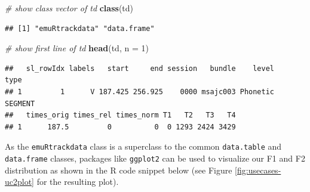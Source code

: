 \documentclass[]{book}
\newenvironment{Shaded}{\begin{snugshade}}{\end{snugshade}}
\newcommand{\CommentTok}[1]{\textcolor[rgb]{0.56,0.35,0.01}{\textit{#1}}}
\newcommand{\DataTypeTok}[1]{\textcolor[rgb]{0.13,0.29,0.53}{#1}}
\newcommand{\DecValTok}[1]{\textcolor[rgb]{0.00,0.00,0.81}{#1}}
\newcommand{\KeywordTok}[1]{\textcolor[rgb]{0.13,0.29,0.53}{\textbf{#1}}}
\newcommand{\NormalTok}[1]{#1}
\newcommand{\OperatorTok}[1]{\textcolor[rgb]{0.81,0.36,0.00}{\textbf{#1}}}
\newcommand{\OtherTok}[1]{\textcolor[rgb]{0.56,0.35,0.01}{#1}}
\newcommand{\StringTok}[1]{\textcolor[rgb]{0.31,0.60,0.02}{#1}}
\theoremstyle{definition}
\theoremstyle{definition}
\theoremstyle{definition}
\theoremstyle{remark}
\begin{document}
\begin{Shaded}
\begin{Highlighting}[]
\CommentTok{# show class vector of td}
\KeywordTok{class}\NormalTok{(td)}
\end{Highlighting}
\end{Shaded}

\begin{verbatim}
## [1] "emuRtrackdata" "data.frame"
\end{verbatim}

\begin{Shaded}
\begin{Highlighting}[]
\CommentTok{# show first line of td}
\KeywordTok{head}\NormalTok{(td, }\DataTypeTok{n =} \DecValTok{1}\NormalTok{)}
\end{Highlighting}
\end{Shaded}

\begin{verbatim}
##   sl_rowIdx labels   start     end session   bundle    level    type
## 1         1      V 187.425 256.925    0000 msajc003 Phonetic SEGMENT
##   times_orig times_rel times_norm T1   T2   T3   T4
## 1      187.5         0          0  0 1293 2424 3429
\end{verbatim}

As the \texttt{emuRtrackdata} class is a superclass to the common
\texttt{data.table} and \texttt{data.frame} classes, packages like
\texttt{ggplot2} can be used to visualize our F1 and F2 distribution as
shown in the R code snippet below (see Figure \ref{fig:usecases-uc2plot}
for the resulting plot).

\begin{Shaded}
\end{Shaded}
\end{document}
